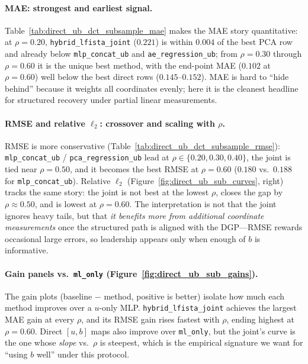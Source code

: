 \paragraph{MAE: strongest and earliest signal.}
Table~\ref{tab:direct_ub_dct_subsample_mae} makes the MAE story quantitative: at $\rho=0.20$, \texttt{hybrid\_lfista\_joint} ($0.221$) is within $0.004$ of the best PCA row and already below \texttt{mlp\_concat\_ub} and \texttt{ae\_regression\_ub}; from $\rho=0.30$ through $\rho=0.60$ it is the unique best method, with the end-point MAE ($0.102$ at $\rho=0.60$) well below the best direct rows ($0.145$--$0.152$). MAE is hard to ``hide behind'' because it weights all coordinates evenly; here it is the cleanest headline for structured recovery under partial linear measurements.

\paragraph{RMSE and relative $\ell_2$: crossover and scaling with $\rho$.}
RMSE is more conservative (Table~\ref{tab:direct_ub_dct_subsample_rmse}): \texttt{mlp\_concat\_ub} / \texttt{pca\_regression\_ub} lead at $\rho\in\{0.20,0.30,0.40\}$, the joint is tied near $\rho=0.50$, and it becomes the best RMSE at $\rho=0.60$ ($0.180$ vs.\ $0.188$ for \texttt{mlp\_concat\_ub}). Relative $\ell_2$ (Figure~\ref{fig:direct_ub_sub_curves}, right) tracks the same story: the joint is not best at the lowest $\rho$, closes the gap by $\rho\approx 0.50$, and is lowest at $\rho=0.60$. The interpretation is not that the joint ignores heavy tails, but that \emph{it benefits more from additional coordinate measurements} once the structured path is aligned with the DGP---RMSE rewards occasional large errors, so leadership appears only when enough of $b$ is informative.

\paragraph{Gain panels vs.\ \texttt{ml\_only} (Figure~\ref{fig:direct_ub_sub_gains}).}
The gain plots (baseline $-$ method, positive is better) isolate how much each method improves over a $u$-only MLP. \texttt{hybrid\_lfista\_joint} achieves the largest MAE gain at every $\rho$, and its RMSE gain rises fastest with $\rho$, ending highest at $\rho=0.60$. Direct $[u,b]$ maps also improve over \texttt{ml\_only}, but the joint's curve is the one whose \emph{slope} vs.\ $\rho$ is steepest, which is the empirical signature we want for ``using $b$ well'' under this protocol.

